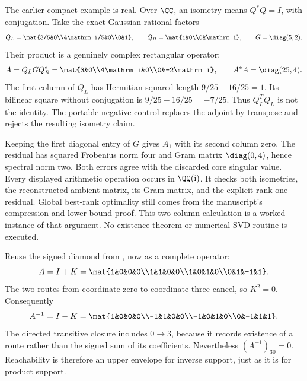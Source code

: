 The earlier compact example is real. Over $\CC$, an isometry means $Q^*Q=I$, with conjugation. Take the exact Gaussian-rational factors
\[
Q_L=\mat{3/5&0\\4\mathrm i/5&0\\0&1},\qquad
Q_R=\mat{1&0\\0&\mathrm i},\qquad G=\diag(5,2).
\]
Their product is a genuinely complex rectangular operator:
\[
A=Q_LGQ_R^*=\mat{3&0\\4\mathrm i&0\\0&-2\mathrm i},
\qquad A^*A=\diag(25,4).
\]
The first column of $Q_L$ has Hermitian squared length $9/25+16/25=1$. Its bilinear square without conjugation is $9/25-16/25=-7/25$. Thus $Q_L^TQ_L$ is not the identity. The portable negative control replaces the adjoint by transpose and rejects the resulting isometry claim.

Keeping the first diagonal entry of $G$ gives $A_1$ with its second column zero. The residual has squared Frobenius norm four and Gram matrix $\diag(0,4)$, hence spectral norm two. Both errors agree with the discarded core singular value. Every displayed arithmetic operation occurs in $\QQ(\mathrm i)$.
It checks both isometries, the reconstructed ambient matrix, its Gram matrix, and the explicit rank-one residual. Global best-rank optimality still comes from the manuscript's compression and lower-bound proof. This two-column calculation is a worked instance of that argument. No existence theorem or numerical SVD routine is executed.

Reuse the signed diamond from , now as a complete operator:
\[
A=I+K=\mat{1&0&0&0\\1&1&0&0\\1&0&1&0\\0&1&-1&1}.
\]
The two routes from coordinate zero to coordinate three cancel, so $K^2=0$. Consequently
\[
A^{-1}=I-K=\mat{1&0&0&0\\-1&1&0&0\\-1&0&1&0\\0&-1&1&1}.
\]
The directed transitive closure includes $0\to3$, because it records existence of a route rather than the signed sum of its coefficients. Nevertheless $(A^{-1})_{30}=0$. Reachability is therefore an upper envelope for inverse support, just as it is for product support.


